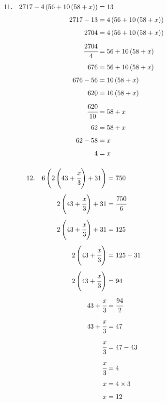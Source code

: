 \documentclass{article}
\begin{document}
\noindent
\begin{minipage}[t]{0.5000\textwidth}
\begin{align*}
11.\hspace{10pt}2717-4\left(56+10\left(58+x\right)\right)&=13\\[4pt]
2717-13&=4\left(56+10\left(58+x\right)\right)\\[4pt]
2704&=4\left(56+10\left(58+x\right)\right)\\[4pt]
\cfrac{2704}{4}&=56+10\left(58+x\right)\\[4pt]
676&=56+10\left(58+x\right)\\[4pt]
676-56&=10\left(58+x\right)\\[4pt]
620&=10\left(58+x\right)\\[4pt]
\cfrac{620}{10}&=58+x\\[4pt]
62&=58+x\\[4pt]
62-58&=x\\[4pt]
4&=x\\[4pt]
\end{align*}
\end{minipage}
\begin{minipage}[t]{0.5000\textwidth}
\begin{align*}
12.\hspace{10pt}6\left(2\left(43+\cfrac{x}{3}\right)+31\right)&=750\\[4pt]
2\left(43+\cfrac{x}{3}\right)+31&=\cfrac{750}{6}\\[4pt]
2\left(43+\cfrac{x}{3}\right)+31&=125\\[4pt]
2\left(43+\cfrac{x}{3}\right)&=125-31\\[4pt]
2\left(43+\cfrac{x}{3}\right)&=94\\[4pt]
43+\cfrac{x}{3}&=\cfrac{94}{2}\\[4pt]
43+\cfrac{x}{3}&=47\\[4pt]
\cfrac{x}{3}&=47-43\\[4pt]
\cfrac{x}{3}&=4\\[4pt]
x&=4\times3\\[4pt]
x&=12\\[4pt]
\end{align*}
\end{minipage}
\vspace{10 mm}
\end{document}
